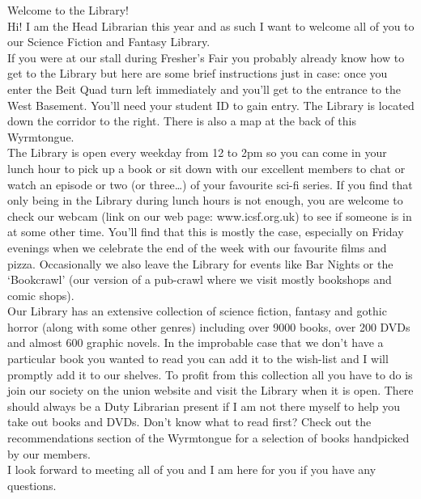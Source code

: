 Welcome to the Library!\\ 
Hi! I am the Head Librarian this year and as such I want to welcome all of you to our Science Fiction and Fantasy Library. \\
If you were at our stall during Fresher’s Fair you probably already know how to get to the Library but here are some brief instructions just in case: once you enter the Beit Quad turn left immediately and you’ll get to the entrance to the West Basement. You’ll need your student ID to gain entry. The Library is located down the corridor to the right. There is also a map at the back of this Wyrmtongue.\\
The Library is open every weekday from 12 to 2pm so you can come in your lunch hour to pick up a book or sit down with our excellent members to chat or watch an episode or two (or three…) of your favourite sci-fi series. If you find that only being in the Library during lunch hours is not enough, you are welcome to check our webcam (link on our web page: www.icsf.org.uk) to see if someone is in at some other time. You’ll find that this is mostly the case, especially on Friday evenings when we celebrate the end of the week with our favourite films and pizza. Occasionally we also leave the Library for events like Bar Nights or the ‘Bookcrawl’ (our version of a pub-crawl where we visit mostly bookshops and comic shops). \\
Our Library has an extensive collection of science fiction, fantasy and gothic horror (along with some other genres) including over 9000 books, over 200 DVDs and almost 600 graphic novels. In the improbable case that we don’t have a particular book you wanted to read you can add it to the wish-list and I will promptly add it to our shelves. To profit from this collection all you have to do is join our society on the union website and visit the Library when it is open. There should always be a Duty Librarian present if I am not there myself to help you take out books and DVDs. Don’t know what to read first? Check out the recommendations section of the Wyrmtongue for a selection of books handpicked by our members. \\
I look forward to meeting all of you and I am here for you if you have any questions.